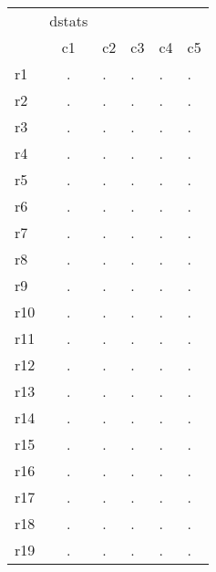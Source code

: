 \begin{tabular}{l*{1}{c}}
\hline\hline
            &      dstats&            &            &            &            \\
            &          c1&          c2&          c3&          c4&          c5\\
\hline
r1          &           .&           .&           .&           .&           .\\
r2          &           .&           .&           .&           .&           .\\
r3          &           .&           .&           .&           .&           .\\
r4          &           .&           .&           .&           .&           .\\
r5          &           .&           .&           .&           .&           .\\
r6          &           .&           .&           .&           .&           .\\
r7          &           .&           .&           .&           .&           .\\
r8          &           .&           .&           .&           .&           .\\
r9          &           .&           .&           .&           .&           .\\
r10         &           .&           .&           .&           .&           .\\
r11         &           .&           .&           .&           .&           .\\
r12         &           .&           .&           .&           .&           .\\
r13         &           .&           .&           .&           .&           .\\
r14         &           .&           .&           .&           .&           .\\
r15         &           .&           .&           .&           .&           .\\
r16         &           .&           .&           .&           .&           .\\
r17         &           .&           .&           .&           .&           .\\
r18         &           .&           .&           .&           .&           .\\
r19         &           .&           .&           .&           .&           .\\

\end{tabular}
